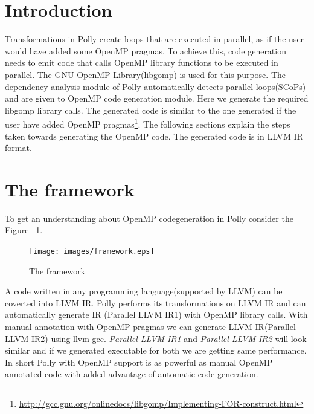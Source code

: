 \label{chap:openmp}

\section{Introduction}
Transformations in Polly create loops that are executed in parallel, as if the user would have
added some OpenMP pragmas. To achieve this, code generation needs to emit code that calls OpenMP
library functions to be executed in parallel. The GNU OpenMP Library(libgomp) is used for this purpose. The
dependency analysis module of Polly automatically detects parallel loops(SCoPs) and are given to OpenMP
code generation module. Here we generate the required libgomp library calls. The generated code is similar
to the one generated if the user have added OpenMP pragmas\footnote{\url{http://gcc.gnu.org/onlinedocs/libgomp/Implementing-FOR-construct.html}}.
The following sections explain the steps taken towards generating the OpenMP code. The generated code is in LLVM IR format.

\section{The framework}

To get an understanding about OpenMP codegeneration in Polly consider the Figure ~\ref{framework}.

\begin{figure}
\begin{center}
  \texttt{[image: images/framework.eps]}
  \caption{The framework}
  \label{framework}
\end{center}  
\end{figure}

A code written in any programming language(supported by LLVM) can be coverted into LLVM IR. Polly
performs its transformations on LLVM IR and can automatically generate IR (Parallel LLVM IR1) with OpenMP
library calls. With manual annotation with OpenMP pragmas we can generate LLVM IR(Parallel LLVM IR2) using
llvm-gcc. \emph{Parallel LLVM IR1} and \emph{Parallel LLVM IR2} will look similar and if we generated
executable for both we are getting same performance. In short Polly with OpenMP support is
as powerful as manual OpenMP annotated code with added advantage of automatic code generation.

